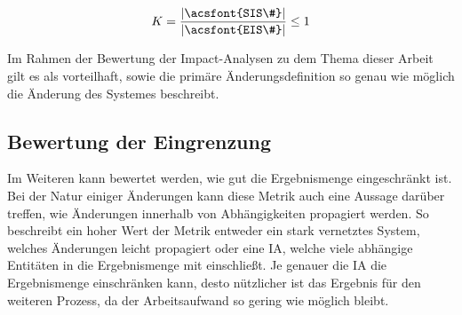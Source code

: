 $$
    K = \dfrac{|\text{\acsfont{SIS\#}}|}{|\text{\acsfont{EIS\#}}|} \leq 1
$$

Im Rahmen der Bewertung der Impact-Analysen zu dem Thema dieser Arbeit gilt es als vorteilhaft, sowie die primäre Änderungsdefinition so genau wie möglich die Änderung des Systemes beschreibt. 




\pagebreak

\subsection{Bewertung der Eingrenzung}

Im Weiteren kann bewertet werden, wie gut die Ergebnismenge eingeschränkt ist.
Bei der Natur einiger Änderungen kann diese Metrik auch eine Aussage darüber treffen, wie Änderungen innerhalb von Abhängigkeiten propagiert werden. 
So beschreibt ein hoher Wert der Metrik entweder ein stark vernetztes System, welches Änderungen leicht propagiert oder eine \ac{IA}, welche viele abhängige Entitäten in die Ergebnismenge mit einschließt.
Je genauer die \ac{IA} die Ergebnismenge einschränken kann, desto nützlicher ist das Ergebnis für den weiteren Prozess, da der Arbeitsaufwand so gering wie möglich bleibt. 

